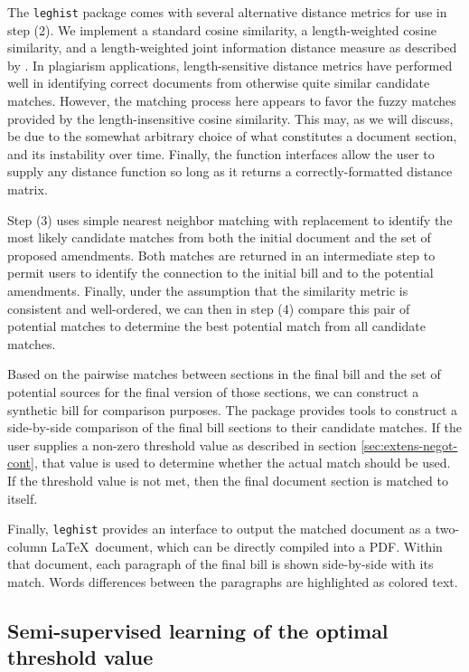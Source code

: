 \documentclass[11pt]{article}
\begin{document}
The \texttt{leghist} package comes with several alternative distance metrics for use
in step (2). We implement a standard cosine similarity, a
length-weighted cosine similarity, and a length-weighted joint
information distance measure as described by \cite{hoad2003methods}. In plagiarism applications, length-sensitive
distance metrics have performed well in identifying correct documents
from otherwise quite similar candidate matches. However,
the matching process here appears to favor the fuzzy matches provided
by the length-insensitive cosine similarity. This may, as we will discuss, be due to the
somewhat arbitrary choice of what constitutes a document section, and
its instability over time. Finally, the function interfaces allow the
user to supply any distance function so long as it returns a
correctly-formatted distance matrix. 

Step (3) uses simple nearest neighbor matching with replacement to
identify the most likely candidate matches from both the initial
document and the set of proposed amendments. Both matches are returned in an
intermediate step to permit users to identify the connection to the
initial bill and to the potential amendments. Finally, under the
assumption that the similarity metric is consistent and well-ordered, we can then in step (4) compare
this pair of potential matches to determine the best potential match
from all candidate matches. 

Based on the pairwise matches between sections in the final bill and
the set of potential sources for the final version of those sections,
we can construct a synthetic bill for comparison purposes. The package
provides tools to construct a side-by-side comparison of the final
bill sections to their candidate matches. If the user supplies a
non-zero threshold value as described in section
\ref{sec:extens-negot-cont}, that
value is used to determine whether the actual match
should be used. If the threshold value is not met, then the final
document section is matched to itself. 

Finally, \texttt{leghist} provides an interface to output the matched
document as a two-column \LaTeX\ document, which can be directly
compiled into a PDF. Within that document, each paragraph of the final
bill is shown side-by-side with its match. Words differences between
the paragraphs are highlighted as colored text. 

\subsection{Semi-supervised learning of the optimal threshold value}
\label{sec:superv-learn-optim}
\end{document}

